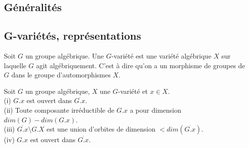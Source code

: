 \subsection{Généralités}
\subsection{G-variétés, représentations}

\begin{defn}[G-variété]
Soit $G$ un groupe algébrique. Une $G$-variété est une variété algébrique $X$ sur laquelle $G$ agit algébriquement. C'est à dire qu'on a un morphisme de groupes de $G$ dans le groupe d'automorphismes $X$.
\end{defn}

\begin{prop}
Soit $G$ un groupe algébrique, $X$ une $G$-variété et $x\in X$.\\
(i) $G.x$ est ouvert dans $\overline{G.x}$.\\
(ii) Toute composante irréductible de $G.x$ a pour dimension $dim (G)-dim(G.x)$.\\
(iii) $\overline{G.x}\setminus G.X$ est une union d'orbites de dimension $<dim(\overline{G.x})$.\\
(iv) $G.x$ est ouvert dans $\overline{G.x}$.
\end{prop}
